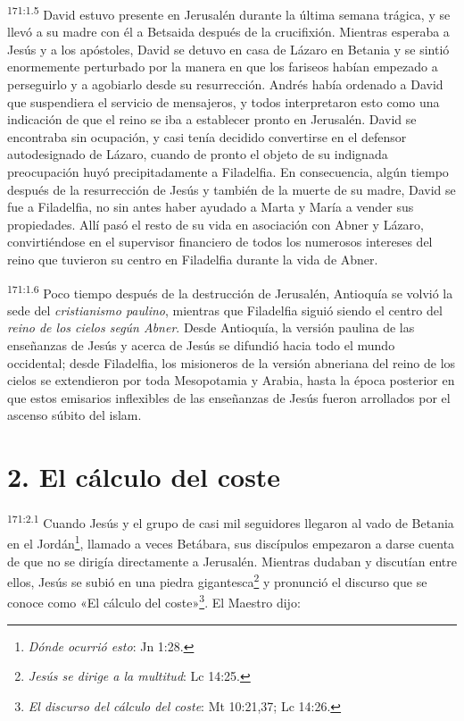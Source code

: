 \par 
\textsuperscript{171:1.5} David estuvo presente en Jerusalén durante la última semana trágica, y se llevó a su madre con él a Betsaida después de la crucifixión. Mientras esperaba a Jesús y a los apóstoles, David se detuvo en casa de Lázaro en Betania y se sintió enormemente perturbado por la manera en que los fariseos habían empezado a perseguirlo y a agobiarlo desde su resurrección. Andrés había ordenado a David que suspendiera el servicio de mensajeros, y todos interpretaron esto como una indicación de que el reino se iba a establecer pronto en Jerusalén. David se encontraba sin ocupación, y casi tenía decidido convertirse en el defensor autodesignado de Lázaro, cuando de pronto el objeto de su indignada preocupación huyó precipitadamente a Filadelfia. En consecuencia, algún tiempo después de la resurrección de Jesús y también de la muerte de su madre, David se fue a Filadelfia, no sin antes haber ayudado a Marta y María a vender sus propiedades. Allí pasó el resto de su vida en asociación con Abner y Lázaro, convirtiéndose en el supervisor financiero de todos los numerosos intereses del reino que tuvieron su centro en Filadelfia durante la vida de Abner.

\par 
\textsuperscript{171:1.6} Poco tiempo después de la destrucción de Jerusalén, Antioquía se volvió la sede del \textit{cristianismo paulino}, mientras que Filadelfia siguió siendo el centro del \textit{reino de los cielos según Abner}. Desde Antioquía, la versión paulina de las enseñanzas de Jesús y acerca de Jesús se difundió hacia todo el mundo occidental; desde Filadelfia, los misioneros de la versión abneriana del reino de los cielos se extendieron por toda Mesopotamia y Arabia, hasta la época posterior en que estos emisarios inflexibles de las enseñanzas de Jesús fueron arrollados por el ascenso súbito del islam.

\section*{2. El cálculo del coste}
\par 
\textsuperscript{171:2.1} Cuando Jesús y el grupo de casi mil seguidores llegaron al vado de Betania en el Jordán\footnote{\textit{Dónde ocurrió esto}: Jn 1:28.}, llamado a veces Betábara, sus discípulos empezaron a darse cuenta de que no se dirigía directamente a Jerusalén. Mientras dudaban y discutían entre ellos, Jesús se subió en una piedra gigantesca\footnote{\textit{Jesús se dirige a la multitud}: Lc 14:25.} y pronunció el discurso que se conoce como «El cálculo del coste»\footnote{\textit{El discurso del cálculo del coste}: Mt 10:21,37; Lc 14:26.}. El Maestro dijo:

